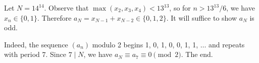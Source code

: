 Let $N=14^{14}$. Observe that $\max(x_2,x_3,x_4)<13^{13}$, so for $n>13^{13}/6$, we have $x_n\in\{0,1\}$. Therefore $a_N=x_{N-1}+x_{N-2}\in\{0,1,2\}$. It will suffice to show $a_N$ is odd.

Indeed, the sequence $(a_n)$ modulo 2 begins 1, 0, 1, 0, 0, 1, 1, $\ldots$ and repeats with period 7. Since $7\mid N$, we have $a_N\equiv a_7\equiv0\pmod2$. The end.

